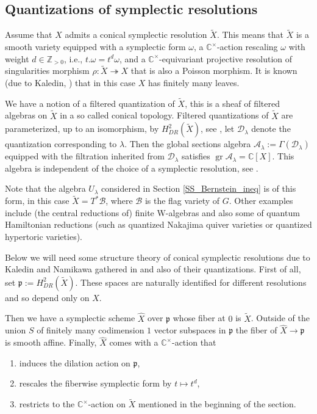 \documentclass[12pt]{amsart}
\newcommand{\A}{\mathcal{A}}
\newcommand{\K}{\mathbb{C}}
\newcommand{\Z}{\mathbb{Z}}
\newcommand{\gr}{\operatorname{gr}}
\newcommand{\C}{\mathbb{C}}
\newcommand{\param}{\mathfrak{p}}
\theoremstyle{definition}
\begin{document}
\subsection{Quantizations of symplectic resolutions}\label{SS_quant_resol}
Assume that $X$ admits a conical symplectic resolution $\tilde{X}$. This means that $\tilde{X}$
is a smooth variety equipped with a symplectic form $\omega$, a $\K^\times$-action rescaling $\omega$
with weight $d\in \Z_{>0}$, i.e., $t.\omega=t^d\omega$, and a $\C^\times$-equivariant projective
resolution of singularities
morphism $\rho:\tilde{X} \twoheadrightarrow X$ that is also a Poisson morphism. It is known (due to Kaledin, \cite{Kaledin}) that in this case $X$ has finitely many leaves.

We have a notion of a filtered quantization of $\tilde{X}$, this is a sheaf of filtered algebras
on $\tilde{X}$ in a so called conical topology. Filtered quantizations of $\tilde{X}$ are parameterized, up to an isomorphism, by $H^2_{DR}(\tilde{X})$, see \cite[Section 2]{quant}, let $\mathcal{D}_\lambda$ denote the quantization
corresponding to $\lambda$. Then the global sections algebra $\A_\lambda:=\Gamma(\mathcal{D}_\lambda)$
equipped with the filtration inherited from $\mathcal{D}_\lambda$  satisfies $\gr \A_\lambda=\K[X]$.
This algebra is independent of the choice of a symplectic resolution, see \cite[Section 3.3]{BPW}.

Note that the algebra $U_\lambda$ considered in Section \ref{SS_Bernstein_ineq} is of this form, in this case $\tilde{X}=T^*\mathcal{B}$, where $\mathcal{B}$
is the flag variety of $G$. Other examples include (the central reductions of) finite W-algebras
and also some of quantum Hamiltonian  reductions (such as quantized Nakajima quiver varieties or
quantized hypertoric varieties).

Below we will need some structure theory of conical symplectic resolutions
due to Kaledin and Namikawa gathered in \cite[Section 2]{BPW} and also of their quantizations.
First of all, set $\param:=H^2_{DR}(\tilde{X})$. These spaces are naturally identified for different resolutions
and so depend only on $X$.

Then we have a symplectic scheme $\widehat{X}$ over $\param$ whose fiber
at $0$ is $\tilde{X}$. Outside of the union $S$ of finitely many codimension $1$ vector subspaces in $\param$ the fiber of
$\widehat{X}\rightarrow \param$ is smooth affine. Finally, $\widehat{X}$ comes with a $\K^\times$-action
that
\begin{enumerate}
\item induces the dilation action on $\param$,
\item rescales the fiberwise symplectic form by $t\mapsto t^d$,
\item restricts to  the $\K^\times$-action on $\tilde{X}$
mentioned in the beginning of the section.
\end{enumerate}
\end{document}
